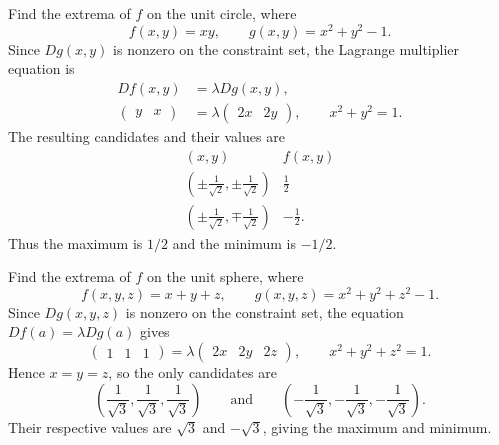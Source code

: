 	\begin{example}
	  \label{ex:1-constraint-in-r2}
		Find the extrema of $f$ on the unit circle, where
		\begin{equation}
			f(x,y)=xy,
			\qquad
			g(x,y)=x^2+y^2-1.
		\end{equation}
		Since $Dg(x,y)$ is nonzero on the constraint set, the Lagrange multiplier equation is
		\begin{equation}
			\begin{aligned}
				Df(x,y) &= \lambda Dg(x,y), \\
				\begin{pmatrix} y & x \end{pmatrix}
				&= \lambda \begin{pmatrix} 2x & 2y \end{pmatrix},
				\qquad x^2+y^2=1.
			\end{aligned}
		\end{equation}
		The resulting candidates and their values are
		\begin{equation}
			\begin{array}{c|c}
				(x,y) & f(x,y) \\ \hline
				\left(\pm \frac{1}{\sqrt{2}},\pm \frac{1}{\sqrt{2}}\right) & \frac{1}{2} \\
				\left(\pm \frac{1}{\sqrt{2}},\mp \frac{1}{\sqrt{2}}\right) & -\frac{1}{2}.
			\end{array}
		\end{equation}
		Thus the maximum is $1/2$ and the minimum is $-1/2$.
	\end{example}

	\begin{example}
	  \label{ex:1-constraint-in-r3}
		Find the extrema of $f$ on the unit sphere, where
		\begin{equation}
			f(x,y,z)=x+y+z,
			\qquad
			g(x,y,z)=x^2+y^2+z^2-1.
		\end{equation}
		Since $Dg(x,y,z)$ is nonzero on the constraint set, the equation $Df(a)=\lambda Dg(a)$ gives
		\begin{equation}
			\begin{pmatrix} 1 & 1 & 1 \end{pmatrix}
			= \lambda \begin{pmatrix} 2x & 2y & 2z \end{pmatrix},
			\qquad x^2+y^2+z^2=1.
		\end{equation}
		Hence $x=y=z$, so the only candidates are
		\begin{equation}
			\left(\frac{1}{\sqrt{3}},\frac{1}{\sqrt{3}},\frac{1}{\sqrt{3}}\right)
			\qquad \text{and} \qquad
			\left(-\frac{1}{\sqrt{3}},-\frac{1}{\sqrt{3}},-\frac{1}{\sqrt{3}}\right).
		\end{equation}
		Their respective values are $\sqrt{3}$ and $-\sqrt{3}$, giving the maximum and minimum.
	\end{example}


